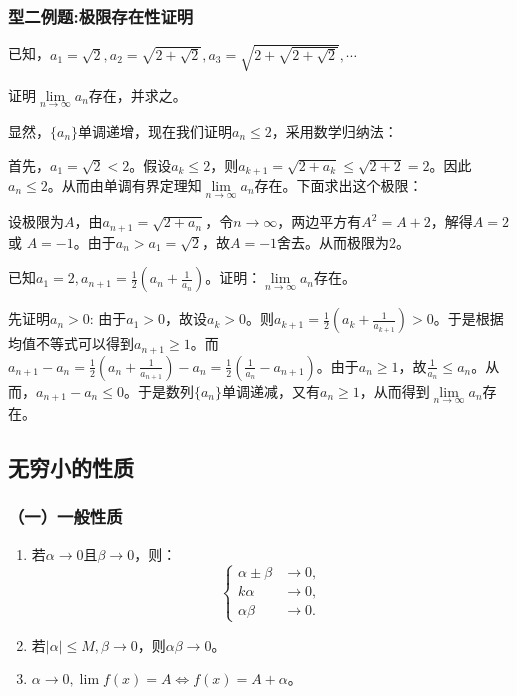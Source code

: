     \subsubsection*{型二例题:极限存在性证明}
    \begin{example}
        已知，$a_1=\sqrt{2}, a_2=\sqrt{2+\sqrt{2}}, a_3=\sqrt{2+\sqrt{2+\sqrt{2}}}, \cdots$

        证明$\lim\limits_{n \to \infty}a_n$存在，并求之。
    \end{example}
    \begin{solution}
        显然，$ \{a_n\} $单调递增，现在我们证明$ a_n \leq 2$，采用数学归纳法：

        首先，$ a_1=\sqrt{2}<2 $。假设$a_k\leq 2$，则$a_{k+1} =\sqrt{2+a_k}\leq \sqrt{2+2}=2$。因此 $a_n \leq 2$。从而由单调有界定理知$\lim\limits_{n \to \infty}a_n$存在。下面求出这个极限：

        设极限为$A$，由$a_{n+1}=\sqrt{2+a_n}$，令$ n \to \infty $，两边平方有$ A^2=A+2 $，解得$ A=2 $或 $ A=-1 $。由于$a_n>a_1=\sqrt{2}$，故$ A=-1 $舍去。从而极限为$ 2 $。
    \end{solution}

    \begin{example}
        已知$ a_1=2, a_{n+1}=\displaystyle\frac{1}{2}(a_n+\displaystyle\frac{1}{a_n})$。证明：$\lim\limits_{n \to \infty}a_n$存在。
    \end{example}
    \begin{solution}
        先证明$ a_n>0 $:
        由于$a_1>0$，故设$a_k>0$。则$a_{k+1}=\displaystyle\frac{1}{2}(a_k+\displaystyle\frac{1}{a_{k+1}})>0$。于是根据均值不等式可以得到$a_{n+1} \geq 1$。而$a_{n+1}-a_n=\displaystyle\frac{1}{2}(a_n+\displaystyle\frac{1}{a_{n+1}})-a_n=\displaystyle\frac{1}{2}(\displaystyle\frac{1}{a_n}-a_{n+1})$。由于$a_{n} \geq 1$，故$\displaystyle\frac{1}{a_n} \leq a_n$。从而，$a_{n+1}-a_n \leq 0$。于是数列$ \{a_n\} $单调递减，又有$a_n \geq 1$，从而得到$\lim\limits_{n \to \infty}a_n$存在。
    \end{solution}

    \subsection{无穷小的性质}
    \subsubsection*{（一）一般性质}
    \begin{enumerate}
        \item 若$ \alpha \to 0 $且$ \beta \to 0 $，则：
        \[ \left\{
            \begin{array}{rl}
                \alpha \pm \beta & \to 0,\\
                k \alpha & \to 0,\\
                \alpha \beta & \to 0.
            \end{array} \right. \]
        \item 若$ \vert \alpha \vert \leq M, \beta \to 0$，则$\alpha \beta \to 0$。
        \item $\alpha \to 0, \lim\limits f(x)=A \Leftrightarrow f(x)=A+\alpha$。
    \end{enumerate}

